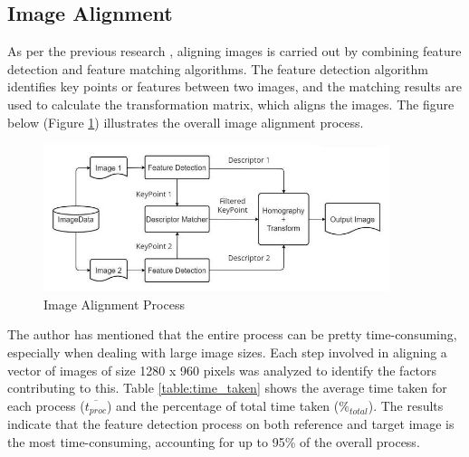 \subsection{Image Alignment}
As per the previous research \cite{Sabtu_2023}, aligning images is carried out by combining feature detection and feature matching algorithms. The feature detection algorithm identifies key points or features between two images, and the matching results are used to calculate the transformation matrix, which aligns the images. The figure below (Figure \ref{fig:image_alignment_process}) illustrates the overall image alignment process.

\begin{figure}[!ht]
    \centering
    \includegraphics[width=0.9\textwidth]{texs/Part2/chapter4/image/ImageAllignmentAlgoDiagram.jpg}
    \caption{Image Alignment Process}
    \label{fig:image_alignment_process}
\end{figure}

The author has mentioned that the entire process can be pretty time-consuming, especially when dealing with large image sizes. Each step involved in aligning a vector of images of size 1280 x 960 pixels was analyzed to identify the factors contributing to this. Table \ref{table:time_taken} shows the average time taken for each process ($\overline{t_{proc}}$) and the percentage of total time taken ($\%_{total}$). The results indicate that the feature detection process on both reference and target image is the most time-consuming, accounting for up to 95\% of the overall process.

